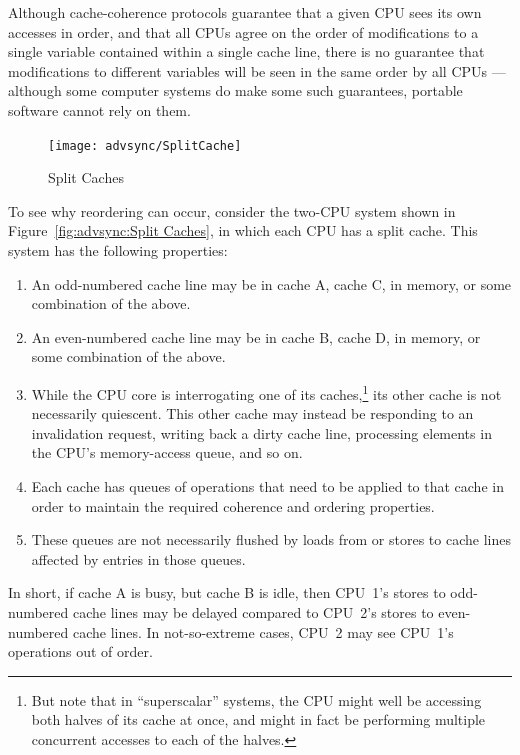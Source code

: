 \begin{enumerate}
Although cache-coherence protocols guarantee that a given CPU sees its
own accesses in order, and that all CPUs agree on the order of modifications
to a single variable contained within a single cache line, there is no
guarantee that modifications to different variables will be seen in
the same order by all CPUs --- although some computer systems do make
some such guarantees, portable software cannot rely on them.

\begin{figure}[htb]
\begin{center}
\texttt{[image: advsync/SplitCache]}
\end{center}
\caption{Split Caches}
\end{figure}

To see why reordering can occur, consider the two-CPU system shown in
Figure~\ref{fig:advsync:Split Caches}, in which each CPU has a split
cache.
This system has the following properties:
\begin{enumerate}
\item	An odd-numbered cache line may be in cache A, cache C,
	in memory, or some combination of the above.
\item	An even-numbered cache line may be in cache B, cache D,
	in memory, or some combination of the above.
\item	While the CPU core is interrogating one of its caches,\footnote{
		But note that in ``superscalar'' systems, the CPU
		might well be accessing both halves of its cache at
		once, and might in fact be performing multiple concurrent
		accesses to each of the halves.}
	its other cache is not necessarily quiescent.
	This other cache may instead be responding to an invalidation
	request, writing back a dirty cache line,
	processing elements in the CPU's memory-access queue, and
	so on.
\item	Each cache has queues of operations that need to be applied
	to that cache in order to maintain the required coherence
	and ordering properties.
\item	These queues are not necessarily flushed by loads from or
	stores to cache lines affected by entries in those queues.
\end{enumerate}

In short, if cache A is busy, but cache B is idle, then CPU~1's
stores to odd-numbered cache lines may be delayed compared to
CPU~2's stores to even-numbered cache lines.
In not-so-extreme cases, CPU~2 may see CPU~1's operations out
of order.


\end{enumerate}
